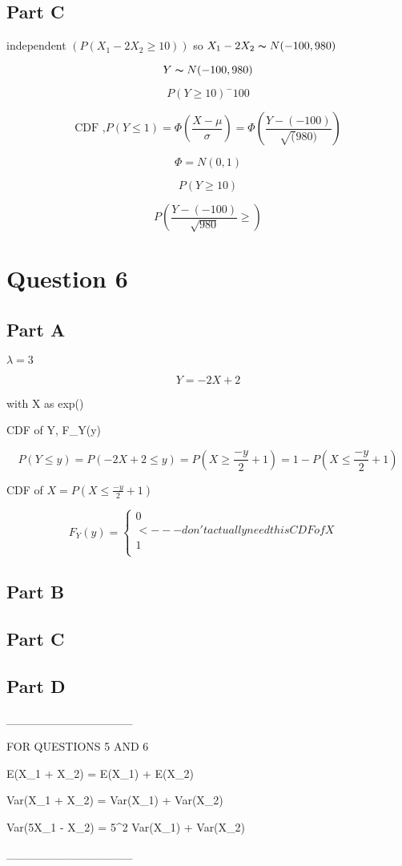 \documentclass[letterpaper]{article}
\begin{document}
\subsection*{Part C}

independent $(P(X_1 - 2X_2 \geq 10))$ so $X_1 -2X_2 \thicksim N(-100, 980)$

$$Y \thicksim N(-100, 980)$$

$$P(Y \geq 10)^-100$$

$$\text{CDF ,} P(Y \leq 1) = \Phi(\frac{X-\mu}{\sigma}) = \Phi(\frac{Y-(-100)}{\sqrt(980)})$$

$$\Phi = N(0,1)$$

$$P(Y \geq 10)$$

$$P(\frac{Y-(-100)}{\sqrt{980}} \geq )$$

\newpage

\section*{Question 6}

\subsection*{Part A}

$\lambda = 3$

$$Y = -2X + 2$$

with X as exp(\lambda)

CDF of Y, F_Y(y)

$$P(Y \leq y) = P(-2X + 2 \leq y) = P(X \geq \frac{-y}{2} + 1) = 1 - P(X \leq \frac{-y}{2} + 1)$$

CDF of $X = P(X \leq \frac{-y}{2} + 1)$

$$F_Y(y) = \begin{cases}
    0           &       \\ <--- don't actually need this
    CDF of X    &       \\
    1           &       \\
\end{cases}$$

\subsection*{Part B}

\subsection*{Part C}

\subsection*{Part D}



_______________

FOR QUESTIONS 5 AND 6

E(X_1 + X_2) = E(X_1) + E(X_2)

Var(X_1 + X_2) = Var(X_1) + Var(X_2)

Var(5X_1 - X_2) = 5^2 \cdot Var(X_1) + Var(X_2)

_______________
\end{document}
